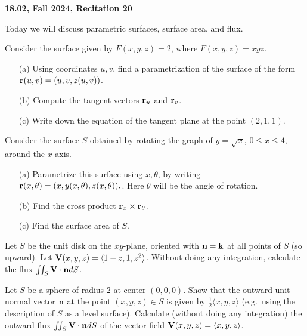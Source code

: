 \documentclass[addpoints, 12pt,answers]{exam}
\begin{document}
\begin{center}
{\bf 18.02, Fall 2024, Recitation 20}
\end{center}

\vspace{5 mm}

Today we will discuss parametric surfaces, surface area, and flux.

\begin{questions}

\question  Consider the surface given by $F(x,y,z) = 2$, where $F(x,y,z) = xyz$.
\begin{enumerate}
\item[(a)] Using coordinates $u,v$, find a parametrization of the surface of the form
  ${\bf r}(u,v) = (u, v, z(u,v))$.
\item[(b)] Compute the tangent vectors ${\bf r}_u$ and ${\bf r}_v$.
\item[(c)] Write down the equation of the tangent plane at the point $(2,1,1)$.
\end{enumerate}

\question  Consider the surface $S$ obtained by rotating the graph of $y = \sqrt{x}$, $0 \leq x \leq 4$,
around the $x$-axis.
\begin{enumerate}
\item[(a)] Parametrize this surface using $x, \theta$, by writing ${\bf r}(x, \theta) = (x, y(x,\theta), z(x,\theta)).$.
 Here $\theta$ will be the angle of rotation.

\item[(b)] Find the cross product ${\bf r}_x \times {\bf r}_\theta$.

\item[(c)] Find the surface area of $S$.
\end{enumerate}

\question
Let $S$ be the unit disk on the $xy$-plane, oriented with ${\bf n} = {\bf k}$ at all points of $S$ (so upward).
Let ${\bf V}(x,y,z) = \langle 1+z, 1, z^2 \rangle$.
Without doing any integration, calculate the flux $\iint_{S} {\bf V}\cdot {\bf n}dS$.

\question
Let $S$ be a sphere of radius $2$ at center $(0,0,0)$.
Show that the outward unit normal vector ${\bf n}$ at the point $(x,y,z) \in S$ is given
by $\frac{1}{2} \langle x,y,z \rangle$ (e.g.\ using the description of $S$ as a level surface).
Calculate (without doing any integration) the outward flux
$\iint_{S} {\bf V}\cdot {\bf n}dS$
of the vector field ${\bf V}(x,y,z) = \langle x,y,z \rangle$.
\end{questions}
\end{document}
